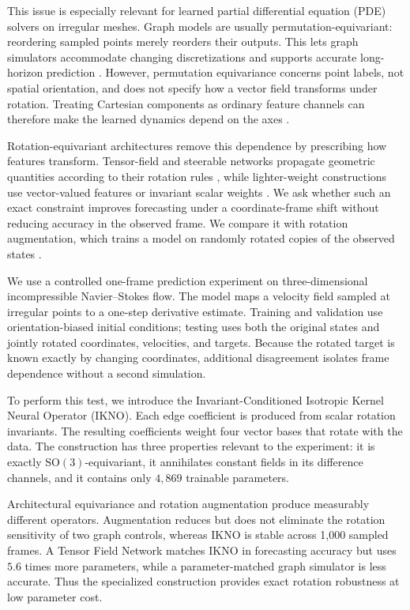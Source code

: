\documentclass[mlmain]{jmlr}
\newcommand{\SO}{\mathrm{SO}(3)}
\newcommand{\IKNO}{\textsc{IKNO}}
\begin{document}
This issue is especially relevant for learned partial differential equation
(PDE) solvers on irregular meshes. Graph models are usually
permutation-equivariant: reordering sampled points merely reorders their
outputs. This lets graph simulators accommodate changing discretizations and
supports accurate long-horizon prediction
\citep{sanchez2020simulate,pfaff2021mesh}. However,
permutation equivariance concerns point labels, not spatial orientation, and
does not specify how a vector field transforms under rotation. Treating
Cartesian components as ordinary feature channels can therefore make the
learned dynamics depend on the axes
\citep{bronstein2021geometric}.

Rotation-equivariant architectures remove this dependence by prescribing how
features transform. Tensor-field and steerable networks propagate geometric
quantities according to their rotation rules
\citep{thomas2018tensor,fuchs2020se3}, while lighter-weight
constructions use vector-valued features or invariant scalar weights
\citep{satorras2021en,villar2021scalars}. We ask whether such an exact constraint improves forecasting
under a coordinate-frame shift without reducing accuracy in the observed
frame. We compare it with rotation augmentation, which trains a model on
randomly rotated copies of the observed states
\citep{brandstetter2022lie,puny2022frame}.

We use a controlled one-frame prediction experiment on three-dimensional
incompressible Navier--Stokes flow. The model maps a velocity field sampled at
irregular points to a one-step derivative estimate. Training and validation
use orientation-biased initial conditions; testing uses both the original
states and jointly rotated coordinates, velocities, and targets. Because the
rotated target is known exactly by changing coordinates, additional
disagreement isolates frame dependence without a second simulation.

To perform this test, we introduce the Invariant-Conditioned Isotropic Kernel
Neural Operator (\IKNO). Each edge coefficient is produced from scalar
rotation invariants. The resulting coefficients weight four vector bases that
rotate with the data. The construction has three properties relevant to the
experiment: it is exactly $\SO$-equivariant, it annihilates constant fields in
its difference channels, and it contains only $4{,}869$ trainable parameters.

Architectural equivariance and rotation augmentation produce measurably
different operators. Augmentation reduces but does not eliminate the rotation
sensitivity of two graph controls, whereas \IKNO{} is stable across 1,000
sampled frames. A Tensor Field Network matches \IKNO{} in forecasting accuracy
but uses $5.6$ times more parameters, while a parameter-matched graph simulator
is less accurate. Thus the specialized construction provides exact rotation
robustness at low parameter cost.
\end{document}
